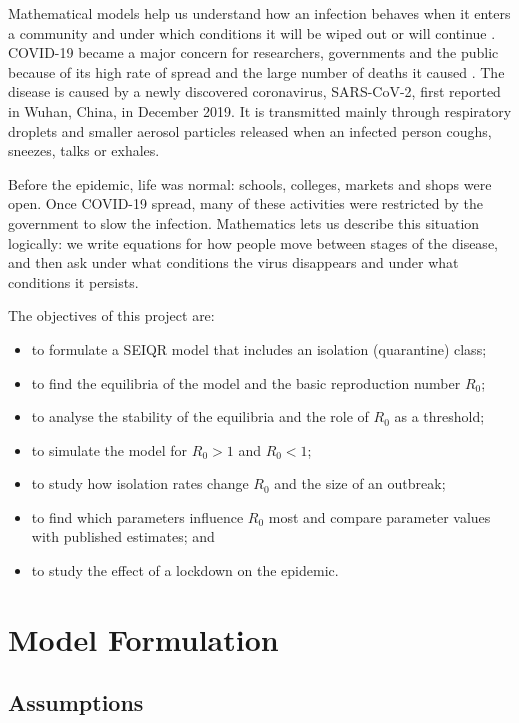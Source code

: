 \documentclass[12pt,a4paper]{article}
\theoremstyle{definition}
\begin{document}
Mathematical models help us understand how an infection behaves when it enters a community and under which conditions it will be wiped out or will continue \cite{r1,r3,r4}. COVID-19 became a major concern for researchers, governments and the public because of its high rate of spread and the large number of deaths it caused \cite{r8}. The disease is caused by a newly discovered coronavirus, SARS-CoV-2, first reported in Wuhan, China, in December 2019. It is transmitted mainly through respiratory droplets and smaller aerosol particles released when an infected person coughs, sneezes, talks or exhales.


Before the epidemic, life was normal: schools, colleges, markets and shops were open. Once COVID-19 spread, many of these activities were restricted by the government to slow the infection. Mathematics lets us describe this situation logically: we write equations for how people move between stages of the disease, and then ask under what conditions the virus disappears and under what conditions it persists.


The objectives of this project are:


\begin{itemize}
\item to formulate a SEIQR model that includes an isolation (quarantine) class;
\item to find the equilibria of the model and the basic reproduction number $R_{0}$;
\item to analyse the stability of the equilibria and the role of $R_{0}$ as a threshold;
\item to simulate the model for $R_{0} > 1$ and $R_{0} < 1$;
\item to study how isolation rates change $R_{0}$ and the size of an outbreak;
\item to find which parameters influence $R_{0}$ most and compare parameter values with published estimates; and
\item to study the effect of a lockdown on the epidemic.
\end{itemize}

\section{Model Formulation}

\subsection{Assumptions}
\end{document}
